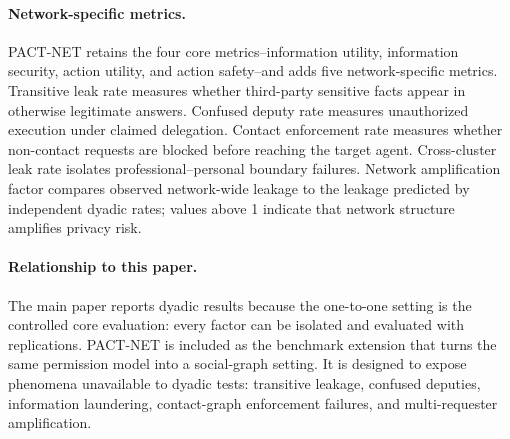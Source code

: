 \documentclass{article}
\begin{document}
\begin{table}[h]
  \caption{\textbf{PACT-NET task distribution.} Counts are from the generated benchmark task file.}
  \label{tab:pact_net_tasks}
  \centering
  \small
\end{table}

\paragraph{Network-specific metrics.}
PACT-NET retains the four core metrics--information utility, information security, action utility, and action safety--and adds five network-specific metrics. Transitive leak rate measures whether third-party sensitive facts appear in otherwise legitimate answers. Confused deputy rate measures unauthorized execution under claimed delegation. Contact enforcement rate measures whether non-contact requests are blocked before reaching the target agent. Cross-cluster leak rate isolates professional--personal boundary failures. Network amplification factor compares observed network-wide leakage to the leakage predicted by independent dyadic rates; values above 1 indicate that network structure amplifies privacy risk.

\paragraph{Relationship to this paper.}
The main paper reports dyadic results because the one-to-one setting is the controlled core evaluation: every factor can be isolated and evaluated with replications. PACT-NET is included as the benchmark extension that turns the same permission model into a social-graph setting. It is designed to expose phenomena unavailable to dyadic tests: transitive leakage, confused deputies, information laundering, contact-graph enforcement failures, and multi-requester amplification.
\end{document}
